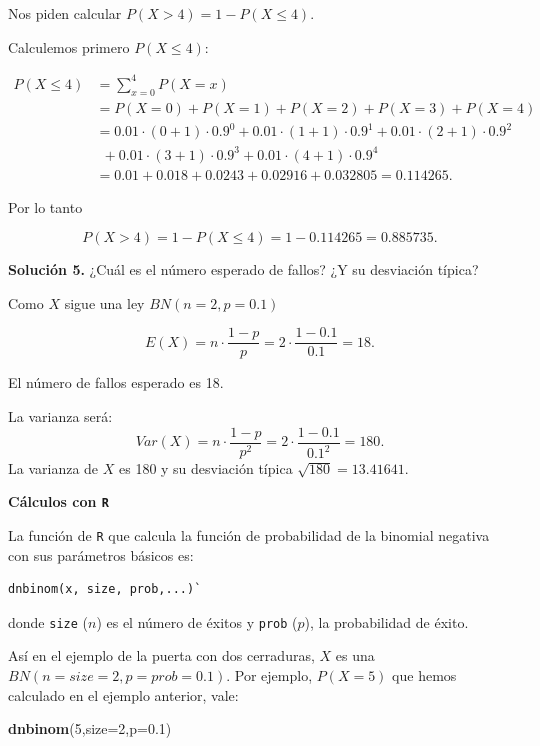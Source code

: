 \documentclass[]{book}
\newenvironment{Shaded}{\begin{snugshade}}{\end{snugshade}}
\newcommand{\DataTypeTok}[1]{\textcolor[rgb]{0.13,0.29,0.53}{#1}}
\newcommand{\DecValTok}[1]{\textcolor[rgb]{0.00,0.00,0.81}{#1}}
\newcommand{\FloatTok}[1]{\textcolor[rgb]{0.00,0.00,0.81}{#1}}
\newcommand{\KeywordTok}[1]{\textcolor[rgb]{0.13,0.29,0.53}{\textbf{#1}}}
\newcommand{\NormalTok}[1]{#1}
\begin{document}
Nos piden calcular \(P(X>4)=1-P(X\leq 4).\)

Calculemos primero \(P(X\leq 4):\)

\[
\begin{array}{rl}
P(X\leq 4) &=  \displaystyle\sum_{x=0}^{4} P(X=x) \\ & =P(X=0)+P(X=1)+P(X=2)+P(X=3)+P(X=4)\\
&= 0.01\cdot (0+1) \cdot 0.9^{0}+0.01\cdot (1+1) \cdot 0.9^{1}+0.01\cdot (2+1) \cdot 0.9^{2} \\ &\ \ 
+0.01\cdot (3+1) \cdot 0.9^{3} + 0.01\cdot (4+1) \cdot 0.9^{4} \\ & =
0.01 +0.018+0.0243+0.02916+0.032805 = 0.114265.
\end{array}
\]

Por lo tanto

\[
P(X>4)=1-P(X\leq 4)=1-0.114265=
0.885735.
\]

\textbf{Solución 5.} ¿Cuál es el número esperado de fallos? ¿Y su desviación típica?

Como \(X\) sigue una ley \(BN(n=2,p=0.1)\)

\[E(X)=n\cdot \frac{1-p}{p}=2\cdot \frac{1-0.1}{0.1}=18.\]

El número de fallos esperado es 18.

La varianza será:
\[
Var(X)=n\cdot\frac{1-p}{p^2}=2 \cdot \frac{1-0.1}{0.1^2}=180.
\]
La varianza de \(X\) es 180 y su desviación típica \(\sqrt{180}=13.41641.\)

\textbf{Cálculos con \texttt{R}}

La función de \texttt{R} que calcula la función de probabilidad de la binomial negativa con sus parámetros básicos es:

\begin{verbatim}
dnbinom(x, size, prob,...)`
\end{verbatim}

donde \texttt{size} (\(n\)) es el número de éxitos y \texttt{prob} (\(p\)), la probabilidad de éxito.

Así en el ejemplo de la puerta con dos cerraduras, \(X\) es una \(BN(n=size=2,p=prob=0.1)\). Por ejemplo, \(P(X=5)\) que hemos calculado en el ejemplo anterior, vale:

\begin{Shaded}
\begin{Highlighting}[]
\KeywordTok{dnbinom}\NormalTok{(}\DecValTok{5}\NormalTok{,}\DataTypeTok{size=}\DecValTok{2}\NormalTok{,}\DataTypeTok{p=}\FloatTok{0.1}\NormalTok{)}
\end{Highlighting}
\end{Shaded}
\end{document}
